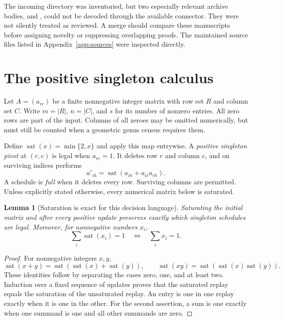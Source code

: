 \documentclass[11pt]{article}
\newtheorem{lemma}[theorem]{Lemma}
\theoremstyle{definition}\newtheorem{definition}[theorem]{Definition}
\theoremstyle{remark}\newtheorem{remark}[theorem]{Remark}
\newcommand{\sat}{\operatorname{sat}}
\begin{document}
The incoming directory was inventoried, but two especially relevant archive bodies,  and , could not be decoded through the available connector. They were not silently treated as reviewed. A merge should compare these manuscripts before assigning novelty or suppressing overlapping proofs. The maintained source files listed in Appendix~\ref{app:sources} were inspected directly.

\section{The positive singleton calculus}
\label{sec:calculus}
Let $A=(a_{rc})$ be a finite nonnegative integer matrix with row set $R$ and column set $C$. Write $m=|R|$, $n=|C|$, and $s$ for its number of nonzero entries. All zero rows are part of the input. Columns of all zeroes may be omitted numerically, but must still be counted when a geometric genus census requires them.

Define $\sat(x)=\min\{2,x\}$ and apply this map entrywise. A \emph{positive singleton pivot} at $(r,c)$ is legal when $a_{rc}=1$. It deletes row $r$ and column $c$, and on surviving indices performs
\begin{equation}
 a'_{ih}=\sat(a_{ih}+a_{ic}a_{rh}).
 \label{eq:pivot}
\end{equation}
A schedule is \emph{full} when it deletes every row. Surviving columns are permitted. Unless explicitly stated otherwise, every numerical matrix below is saturated.

\begin{lemma}[Saturation is exact for this decision language]
\label{lem:saturation}
Saturating the initial matrix and after every positive update preserves exactly which singleton schedules are legal. Moreover, for nonnegative numbers $x_i$,
\[
 \sum_i\sat(x_i)=1 \quad\Longleftrightarrow\quad \sum_i x_i=1.
\]
\end{lemma}
\begin{proof}
For nonnegative integers $x,y$,
\[
 \sat(x+y)=\sat(\sat(x)+\sat(y)),\qquad
 \sat(xy)=\sat(\sat(x)\sat(y)).
\]
These identities follow by separating the cases zero, one, and at least two. Induction over a fixed sequence of updates proves that the saturated replay equals the saturation of the unsaturated replay. An entry is one in one replay exactly when it is one in the other. For the second assertion, a sum is one exactly when one summand is one and all other summands are zero.
\end{proof}
\end{document}
